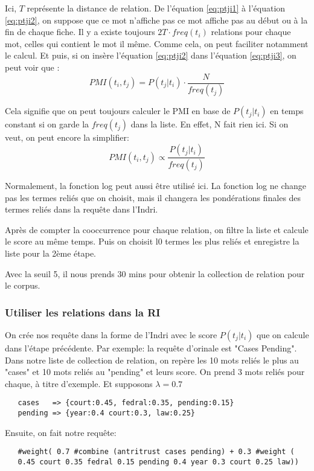 \documentclass[a4paper]{article}
\begin{document}
Ici, $T$ représente la distance de relation. De l’équation \ref{eq:ptji1} à l'équation \ref{eq:ptji2}, on suppose que ce mot n'affiche pas ce mot affiche pas au début ou à la fin de chaque fiche. Il y a existe toujours $2T\cdot freq(t_i)$ relations pour chaque mot, celles qui contient le mot il même. Comme cela, on peut faciliter notamment le calcul. Et puis, si on insère l'équation \ref{eq:ptji2} dans l'équation \ref{eq:ptji3}, on peut voir que :
\[PMI(t_i,t_j)=P(t_j|t_i)\cdot \frac{N}{freq(t_j)}\]

Cela signifie que on peut toujours calculer le PMI en base de $P(t_j|t_i)$ en temps constant si on garde la $freq(t_j)$ dans la liste. En effet, N fait rien ici. Si on veut, on peut encore la simplifier:
\[PMI(t_i,t_j)\propto  \frac{P(t_j|t_i)}{freq(t_j)}\]

Normalement, la fonction log peut aussi être utilisé ici. La fonction log ne change pas les termes reliés que on choisit, mais il changera les pondérations finales des termes reliés dans la requête dans l'Indri.

Après de compter la cooccurrence pour chaque relation, on filtre la liste et calcule le score au même temps. Puis on choisit l0 termes les plus reliés et enregistre la liste pour la 2ème étape.

Avec la seuil 5, il nous prends 30 mins pour obtenir la collection de relation pour le corpus.

\subsubsection{Utiliser les relations dans la RI}

On crée nos requête dans la forme de l'Indri avec le score $P(t_j|t_i)$ que on calcule dans l'étape précédente. Par exemple: la requête d'orinale est "Cases Pending". Dans notre liste de collection de relation, on repère les 10 mots reliés le plus au "cases" et 10 mots reliés au "pending" et leurs score. On prend 3 mots reliés pour chaque, à titre d'exemple. Et supposons $\lambda=0.7$
\begin{lstlisting}
   cases   => {court:0.45, fedral:0.35, pending:0.15}
   pending => {year:0.4 court:0.3, law:0.25}
\end{lstlisting}
Ensuite, on fait notre requête:
\begin{lstlisting}
   #weight( 0.7 #combine (antritrust cases pending) + 0.3 #weight ( 
   0.45 court 0.35 fedral 0.15 pending 0.4 year 0.3 court 0.25 law))
\end{lstlisting}
\end{document}
